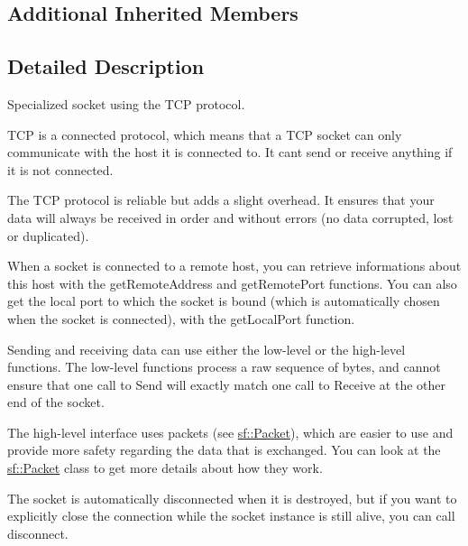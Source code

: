 \subsection*{Additional Inherited Members}


\subsection{Detailed Description}
Specialized socket using the T\+CP protocol. 

T\+CP is a connected protocol, which means that a T\+CP socket can only communicate with the host it is connected to. It can\textquotesingle{}t send or receive anything if it is not connected.

The T\+CP protocol is reliable but adds a slight overhead. It ensures that your data will always be received in order and without errors (no data corrupted, lost or duplicated).

When a socket is connected to a remote host, you can retrieve informations about this host with the get\+Remote\+Address and get\+Remote\+Port functions. You can also get the local port to which the socket is bound (which is automatically chosen when the socket is connected), with the get\+Local\+Port function.

Sending and receiving data can use either the low-\/level or the high-\/level functions. The low-\/level functions process a raw sequence of bytes, and cannot ensure that one call to Send will exactly match one call to Receive at the other end of the socket.

The high-\/level interface uses packets (see \hyperlink{classsf_1_1_packet}{sf\+::\+Packet}), which are easier to use and provide more safety regarding the data that is exchanged. You can look at the \hyperlink{classsf_1_1_packet}{sf\+::\+Packet} class to get more details about how they work.

The socket is automatically disconnected when it is destroyed, but if you want to explicitly close the connection while the socket instance is still alive, you can call disconnect.

